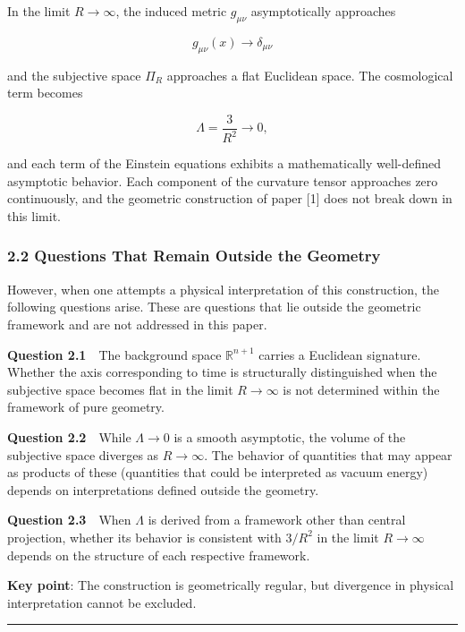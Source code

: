 \documentclass[a4paper,11pt]{article}
\theoremstyle{definition}
\begin{document}
In the limit \(R \to \infty\), the induced metric \(g_{\mu\nu}\) asymptotically approaches

\[
g_{\mu\nu}(x) \longrightarrow \delta_{\mu\nu}
\]

and the subjective space \(\Pi_R\) approaches a flat Euclidean space. The cosmological term becomes

\[
\Lambda = \frac{3}{R^2} \longrightarrow 0,
\]

and each term of the Einstein equations exhibits a mathematically well-defined asymptotic behavior. Each component of the curvature tensor approaches zero continuously, and the geometric construction of paper {[}1{]} does not break down in this limit.

\subsubsection{2.2 Questions That Remain Outside the Geometry}\label{questions-that-remain-outside-the-geometry}

However, when one attempts a physical interpretation of this construction, the following questions arise. These are questions that lie outside the geometric framework and are not addressed in this paper.

\textbf{Question 2.1}　The background space \(\mathbb{R}^{n+1}\) carries a Euclidean signature. Whether the axis corresponding to time is structurally distinguished when the subjective space becomes flat in the limit \(R \to \infty\) is not determined within the framework of pure geometry.

\textbf{Question 2.2}　While \(\Lambda \to 0\) is a smooth asymptotic, the volume of the subjective space diverges as \(R \to \infty\). The behavior of quantities that may appear as products of these (quantities that could be interpreted as vacuum energy) depends on interpretations defined outside the geometry.

\textbf{Question 2.3}　When \(\Lambda\) is derived from a framework other than central projection, whether its behavior is consistent with \(3/R^2\) in the limit \(R \to \infty\) depends on the structure of each respective framework.

\textbf{Key point}: The construction is geometrically regular, but divergence in physical interpretation cannot be excluded.

\begin{center}\rule{0.5\linewidth}{0.5pt}\end{center}
\end{document}

